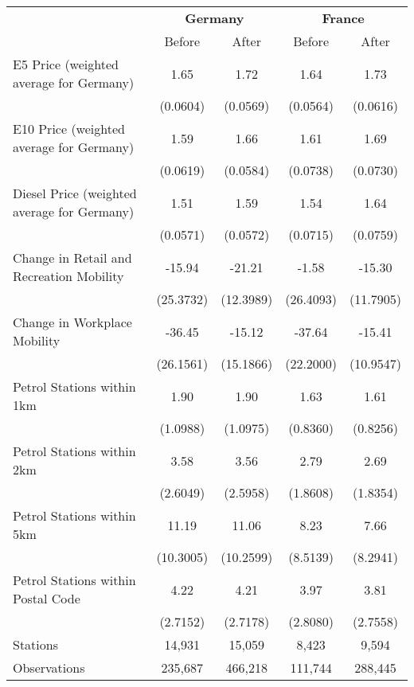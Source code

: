 \begin{tabular}{l*{4}{c}}
\toprule
                    &\multicolumn{2}{c}{\textbf{Germany}}&\multicolumn{2}{c}{\textbf{France}}\\\cmidrule(lr){2-3}\cmidrule(lr){4-5}
                    &\multicolumn{1}{c}{Before}&\multicolumn{1}{c}{After}&\multicolumn{1}{c}{Before}&\multicolumn{1}{c}{After}\\
\midrule
E5 Price (weighted average for Germany)&        1.65&        1.72&        1.64&        1.73\\
                    &    (0.0604)&    (0.0569)&    (0.0564)&    (0.0616)\\
E10 Price (weighted average for Germany)&        1.59&        1.66&        1.61&        1.69\\
                    &    (0.0619)&    (0.0584)&    (0.0738)&    (0.0730)\\
Diesel Price (weighted average for Germany)&        1.51&        1.59&        1.54&        1.64\\
                    &    (0.0571)&    (0.0572)&    (0.0715)&    (0.0759)\\
Change in Retail and Recreation Mobility&      -15.94&      -21.21&       -1.58&      -15.30\\
                    &   (25.3732)&   (12.3989)&   (26.4093)&   (11.7905)\\
Change in Workplace Mobility&      -36.45&      -15.12&      -37.64&      -15.41\\
                    &   (26.1561)&   (15.1866)&   (22.2000)&   (10.9547)\\
Petrol Stations within 1km&        1.90&        1.90&        1.63&        1.61\\
                    &    (1.0988)&    (1.0975)&    (0.8360)&    (0.8256)\\
Petrol Stations within 2km&        3.58&        3.56&        2.79&        2.69\\
                    &    (2.6049)&    (2.5958)&    (1.8608)&    (1.8354)\\
Petrol Stations within 5km&       11.19&       11.06&        8.23&        7.66\\
                    &   (10.3005)&   (10.2599)&    (8.5139)&    (8.2941)\\
Petrol Stations within Postal Code&        4.22&        4.21&        3.97&        3.81\\
                    &    (2.7152)&    (2.7178)&    (2.8080)&    (2.7558)\\
\midrule
Stations            &      14,931&      15,059&       8,423&       9,594\\
Observations        &     235,687&     466,218&     111,744&     288,445\\
\bottomrule
\end{tabular}
